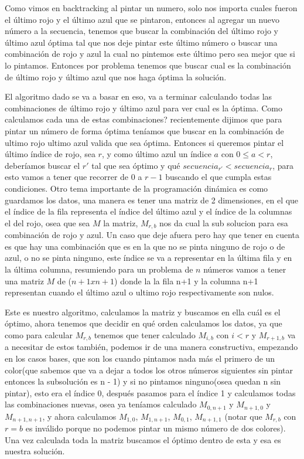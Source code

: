 Como vimos en backtracking al pintar un numero, solo nos importa cuales fueron el último rojo y el último azul que se pintaron, entonces al agregar un nuevo número a la secuencia, tenemos que buscar la combinación del último rojo y último azul óptima tal que nos deje pintar este último número o buscar una combinación de rojo y azul la cual no pintemos este último pero sea mejor que si lo pintamos. Entonces por problema tenemos que buscar cual es la combinación de último rojo y último azul que nos haga óptima la solución.

El algoritmo dado se va a basar en eso, va a terminar calculando todas las combinaciones de último rojo y último azul para ver cual es la óptima. Como calculamos cada una de estas combinaciones? recientemente dijimos que para pintar un número de forma óptima teníamos que buscar en la combinación de ultimo rojo ultimo azul valida que sea óptima. Entonces si queremos pintar el último índice de rojo, sea $r$, y como último azul un índice $a$ con $0 \leq a < r$, deberíamos buscar el $r'$ tal que sea óptimo y qué $secuencia_{r'} < secuencia_r$, para esto vamos a tener que recorrer de $0$ a $r-1$ buscando el que cumpla estas condiciones.
Otro tema importante de la programación dinámica es como guardamos los datos, una manera es tener una matriz de 2 dimensiones, en el que el índice de la fila representa el índice del último azul y el índice de la columnas el del rojo, osea que sea $M$ la matriz, $M_{r,b}$ nos da cual la sub solucion para esa combinación de rojo y azul. Un caso que deje afuera pero hay que tener en cuenta es que hay una combinación que es en la que no se pinta ninguno de rojo o de azul, o no se pinta ninguno, este índice se va a representar en la última fila y en la última columna, resumiendo para un problema de $n$ números vamos a tener una matriz $M$ de ($n+1 x n+1$) donde la la fila n+1 y la columna n+1 representan cuando el último azul o ultimo rojo respectivamente son nulos.

Este es nuestro algoritmo, calculamos la matriz y buscamos en ella cuál es el óptimo, ahora tenemos que decidir en qué orden calculamos los datos, ya que como para calcular $M_{r,b}$ tenemos que tener calculado $M_{i,b}$ con $i<r$ y $M_{r+1,b}$ va a necesitar de estos también, podemos ir de una manera constructiva, empezando en los casos bases, que son los cuando pintamos nada más el primero de un color(que sabemos que va a dejar a todos los otros números siguientes sin pintar entonces la subsolución es n - 1) y si no pintamos ninguno(osea quedan n sin pintar), esto era el índice 0, después pasamos para el índice 1 y calculamos todas las combinaciones nuevas, osea ya teníamos calculado $M_{0,n+1}$ y $M_{n+1,0}$ y $M_{n+1,n+1}$, y ahora calculamos $M_{1,0}$, $M_{1,n+1}$, $M_{0,1}$, $M_{n+1, 1}$ (notar que $M_{r,b}$ con $r = b$ es inválido porque no podemos pintar un mismo número de dos colores). Una vez calculada toda la matriz buscamos el óptimo dentro de esta y esa es nuestra solución.\\

